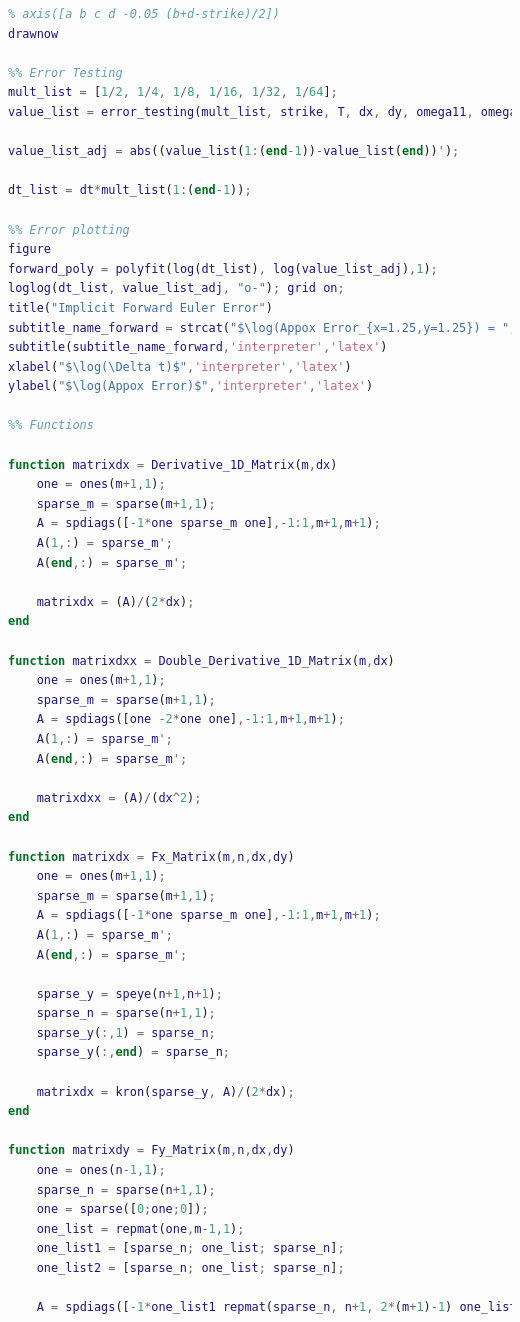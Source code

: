 \documentclass[12pt,letterpaper]{article}
\begin{document}
\begin{lstlisting}[language = Matlab]
% caxis([-0.05, (b+d-strike)/2])                    % Uncomment for Graph of All of U
% axis([a b c d -0.05 (b+d-strike)/2])
drawnow

%% Error Testing
mult_list = [1/2, 1/4, 1/8, 1/16, 1/32, 1/64];
value_list = error_testing(mult_list, strike, T, dx, dy, omega11, omega12, r);

value_list_adj = abs((value_list(1:(end-1))-value_list(end))');

dt_list = dt*mult_list(1:(end-1));

%% Error plotting
figure
forward_poly = polyfit(log(dt_list), log(value_list_adj),1);
loglog(dt_list, value_list_adj, "o-"); grid on;
title("Implicit Forward Euler Error")
subtitle_name_forward = strcat("$\log(Appox Error_{x=1.25,y=1.25}) = ", sprintf("%2.6f", forward_poly(1)), "\log(\Delta t) + ", sprintf("%2.6f", forward_poly(2)), "$");
subtitle(subtitle_name_forward,'interpreter','latex')
xlabel("$\log(\Delta t)$",'interpreter','latex')
ylabel("$\log(Appox Error)$",'interpreter','latex')

%% Functions

function matrixdx = Derivative_1D_Matrix(m,dx)
    one = ones(m+1,1);
    sparse_m = sparse(m+1,1);
    A = spdiags([-1*one sparse_m one],-1:1,m+1,m+1);
    A(1,:) = sparse_m';
    A(end,:) = sparse_m';
 
    matrixdx = (A)/(2*dx);
end

function matrixdxx = Double_Derivative_1D_Matrix(m,dx)
    one = ones(m+1,1);
    sparse_m = sparse(m+1,1);
    A = spdiags([one -2*one one],-1:1,m+1,m+1);
    A(1,:) = sparse_m';
    A(end,:) = sparse_m';

    matrixdxx = (A)/(dx^2);
end

function matrixdx = Fx_Matrix(m,n,dx,dy)
    one = ones(m+1,1);
    sparse_m = sparse(m+1,1);
    A = spdiags([-1*one sparse_m one],-1:1,m+1,m+1);
    A(1,:) = sparse_m';
    A(end,:) = sparse_m';

    sparse_y = speye(n+1,n+1);
    sparse_n = sparse(n+1,1);
    sparse_y(:,1) = sparse_n;
    sparse_y(:,end) = sparse_n;
 
    matrixdx = kron(sparse_y, A)/(2*dx);
end

function matrixdy = Fy_Matrix(m,n,dx,dy)
    one = ones(n-1,1);
    sparse_n = sparse(n+1,1);
    one = sparse([0;one;0]);
    one_list = repmat(one,m-1,1);
    one_list1 = [sparse_n; one_list; sparse_n];
    one_list2 = [sparse_n; one_list; sparse_n];

    A = spdiags([-1*one_list1 repmat(sparse_n, n+1, 2*(m+1)-1) one_list2],-(m+1):(m+1),(m+1)*(n+1),(m+1)*(n+1));
 

\end{lstlisting}
\end{document}
